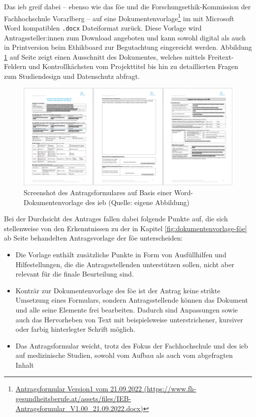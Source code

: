 Das \ac{ieb} greif dabei -- ebenso wie das \ac{föe} und die Forschungsethik-Kommission der Fachhochschule Vorarlberg -- auf eine Dokumentenvorlage\footnote{\href{https://www.fh-gesundheitsberufe.at/assets/files/IEB-Antragsformular_V1.00_21.09.2022.docx}{Antragsformular Version1 vom 21.09.2022 (\url{https://www.fh-gesundheitsberufe.at/assets/files/IEB-Antragsformular_V1.00_21.09.2022.docx)}}} im mit Microsoft Word kompatiblen \texttt{.docx} Dateiformat zurück. Diese Vorlage wird Antragssteller:innen zum Download angeboten und kann sowohl digital als auch in Printversion beim Ethikboard zur Begutachtung eingereicht werden. \cite{fh_gesundheitsberufe_oo_gmbh_einreichung_2023} Abbildung \ref{fig:dokumentenvorlage-ieb} auf Seite \pageref{fig:dokumentenvorlage-ieb} zeigt einen Ausschnitt des Dokumentes, welches mittels Freitext-Feldern und Kontrollkächsten vom Projekttitel bis hin zu detaillierten Fragen zum Studiendesign und Datenschutz abfragt.

\begin{figure}[ht]
    \centering
    \includegraphics[scale=0.21]{thesis/images/Luidold_Word-Vorlage-IEB-FH-Gesundheitsberufe-OOE.png}
    \caption[Screenshot der Word-Dokumentenvorlage des Institutionellen Ethikboards der FH Gesundheitsberufe OÖ]{Screenshot des Antragsformulares auf Basis einer Word-Dokumentenvorlage des \ac{ieb} (Quelle: eigene Abbildung)}
    \label{fig:dokumentenvorlage-ieb}
\end{figure}

Bei der Durchsicht des Antrages fallen dabei folgende Punkte auf, die sich stellenweise von den Erkenntnissen zu der in Kapitel \ref{fig:dokumentenvorlage-föe} ab Seite \pageref{sub-sec:vorlage-föe} behandelten Antragsvorlage der \ac{föe} unterscheiden:
\begin{itemize}
    \item Die Vorlage enthält zusätzliche Punkte in Form von Ausfüllhilfen und Hilfestellungen, die die Antragsstellenden unterstützen sollen, nicht aber relevant für die finale Beurteilung sind.
    \item Konträr zur Dokumentenvorlage des \ac{föe} ist der Antrag keine strikte Umsetzung eines Formulars, sondern Antragsstellende können das Dokument und alle seine Elemente frei bearbeiten. Dadurch sind Anpassungen sowie auch das Hervorheben von Text mit beispielsweise unterstrichener, kursiver oder farbig hinterlegter Schrift möglich.
    \item Das Antragsformular weicht, trotz des Fokus der Fachhochschule und des \ac{ieb} auf medizinische Studien, sowohl vom Aufbau als auch vom abgefragten Inhalt 
\end{itemize}

